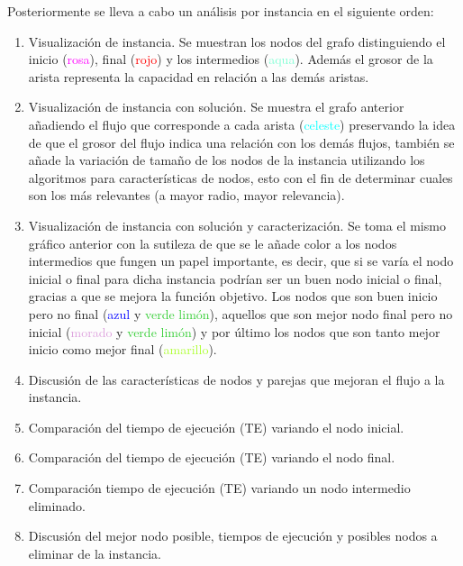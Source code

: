 \documentclass[12pt]{article}
\begin{document}
Posteriormente se lleva a cabo un análisis por instancia en el siguiente orden:
\begin{enumerate}
\setlength\itemsep{.1cm}

\item Visualización de instancia. Se muestran los nodos del grafo distinguiendo el inicio (\textcolor{Magenta}{rosa}), final (\textcolor{red}{rojo}) y los intermedios (\textcolor{Aquamarine}{aqua}). Además el grosor de la arista representa la capacidad en relación a las demás aristas.

\item Visualización de instancia con solución. Se muestra el grafo anterior añadiendo el flujo que corresponde a cada arista (\textcolor{Cyan}{celeste}) preservando la idea de que el grosor del flujo indica una relación con los demás flujos, también se añade la variación de tamaño de los nodos de la instancia utilizando los algoritmos para características de nodos, esto con el fin de determinar cuales son los más relevantes (a mayor radio, mayor relevancia).

\item Visualización de instancia con solución y caracterización. Se toma el mismo gráfico anterior con la sutileza de que se le añade color a los nodos intermedios que fungen un papel importante, es decir, que si se varía el nodo inicial o final para dicha instancia podrían ser un buen nodo inicial o final, gracias a que se mejora la función objetivo. Los nodos que son buen inicio pero no final (\textcolor{blue}{azul} y \textcolor{LimeGreen}{verde limón}), aquellos que son mejor nodo final pero no inicial (\textcolor{Plum}{morado} y \textcolor{LimeGreen}{verde limón}) y por último los nodos que son tanto mejor inicio como mejor final (\textcolor{GreenYellow}{amarillo}).

\item Discusión de las características de nodos y parejas que mejoran el flujo a la instancia. 

\item Comparación del tiempo de ejecución (TE) variando el nodo inicial. 

\item Comparación del tiempo de ejecución (TE) variando el nodo final.

\item Comparación tiempo de ejecución (TE) variando un nodo intermedio eliminado.

\item Discusión del mejor nodo posible, tiempos de ejecución y posibles nodos a eliminar de la instancia. 
\end{enumerate}
\end{document}
